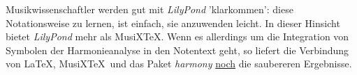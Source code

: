 Musikwissenschaftler werden gut mit \textit{LilyPond} 'klarkommen': diese
Notationsweise zu lernen, ist einfach, sie anzuwenden leicht. In dieser Hinsicht
bietet \textit{LilyPond} mehr als MusiX\TeX. Wenn es allerdings um die Integration
von Symbolen der Harmonieanalyse in den Notentext geht, so liefert die
Verbindung von \LaTeX, MusiX\TeX\ und das Paket \textit{harmony} \underline{noch} die
saubereren Ergebnisse.






%
